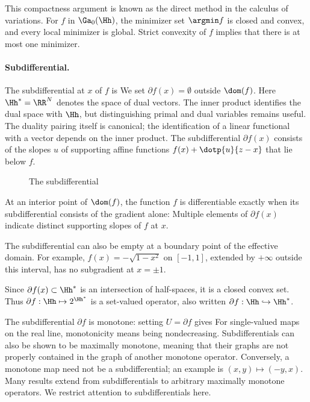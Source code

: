 This compactness argument is known as the direct method in the calculus of variations.
%
For $f$ in $\Ga_0(\Hh)$, the minimizer set $\argmin f$ is closed and convex, and every local minimizer is global. Strict convexity of $f$ implies that there is at most one minimizer.

\paragraph{Subdifferential.}

The subdifferential at $x$ of $f$ is
We set $\partial f(x)=\emptyset$ outside $\dom(f)$. Here $\Hh^*=\RR^N$ denotes the space of dual vectors. The inner product identifies the dual space with $\Hh$, but distinguishing primal and dual variables remains useful. The duality pairing itself is canonical; the identification of a linear functional with a vector depends on the inner product.
%
The subdifferential $\partial f(x)$ consists of the slopes $u$ of supporting affine functions $f(x) + \dotp{u}{z-x}$ that lie below $f$.


\begin{figure}[tbp]
\centering
{}
\caption{The subdifferential}
\label{fig-review-convex-analysis-subdifferential}
\end{figure}
At an interior point of $\dom(f)$, the function $f$ is differentiable exactly when its subdifferential consists of the gradient alone:
Multiple elements of $\partial f(x)$ indicate distinct supporting slopes of $f$ at $x$.

The subdifferential can also be empty at a boundary point of the effective domain. For example, $f(x)=-\sqrt{1-x^2}$ on $[-1,1]$, extended by $+\infty$ outside this interval, has no subgradient at $x=\pm1$.

Since $\partial f(x) \subset \Hh^*$ is an intersection of half-spaces, it is a closed convex set.
%
Thus $\partial f : \Hh \mapsto 2^{\Hh^*}$ is a set-valued operator, also written $\partial f : \Hh \hookrightarrow \Hh^*$.

\begin{rem}
The subdifferential $\partial f$ is monotone: setting $U=\partial f$ gives
For single-valued maps on the real line, monotonicity means being nondecreasing.
%
Subdifferentials can also be shown to be maximally monotone, meaning that their graphs are not properly contained in the graph of another monotone operator.
%
Conversely, a monotone map need not be a subdifferential; an example is $(x,y) \mapsto (-y,x)$.
% 
Many results extend from subdifferentials to arbitrary maximally monotone operators. We restrict attention to subdifferentials here.
\end{rem}

